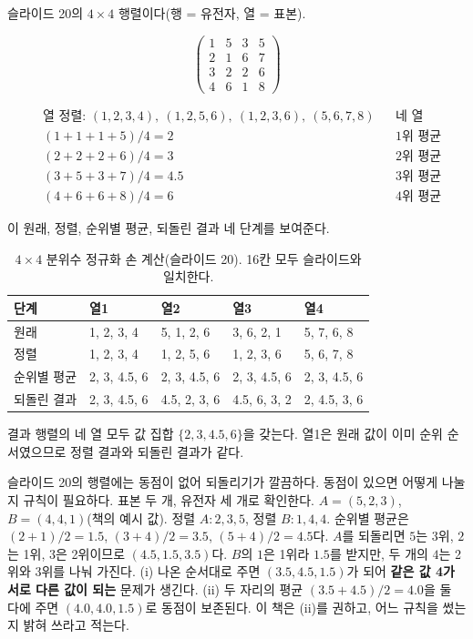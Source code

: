 \begin{example}
\label{ex:qq-quantile-norm}
슬라이드 20의 $4 \times 4$ 행렬이다(행 = 유전자, 열 = 표본).

\[
  \begin{pmatrix} 1 & 5 & 3 & 5 \\ 2 & 1 & 6 & 7 \\ 3 & 2 & 2 & 6 \\ 4 & 6 & 1 & 8 \end{pmatrix}
\]

\begin{align*}
  &\text{열 정렬: } (1,2,3,4),\ (1,2,5,6),\ (1,2,3,6),\ (5,6,7,8) && \text{네 열}\\
  &(1{+}1{+}1{+}5)/4 = 2 && \text{1위 평균}\\
  &(2{+}2{+}2{+}6)/4 = 3 && \text{2위 평균}\\
  &(3{+}5{+}3{+}7)/4 = 4.5 && \text{3위 평균}\\
  &(4{+}6{+}6{+}8)/4 = 6 && \text{4위 평균}
\end{align*}

이 원래, 정렬, 순위별 평균, 되돌린 결과 네
단계를 보여준다.

\begin{table}[H]\centering
\begin{tabularx}{\linewidth}{@{}l X X X X@{}}
\toprule
단계 & 열1 & 열2 & 열3 & 열4 \\
\midrule
원래 & 1, 2, 3, 4 & 5, 1, 2, 6 & 3, 6, 2, 1 & 5, 7, 6, 8 \\
\midrule
정렬 & 1, 2, 3, 4 & 1, 2, 5, 6 & 1, 2, 3, 6 & 5, 6, 7, 8 \\
\midrule
순위별 평균 & 2, 3, 4.5, 6 & 2, 3, 4.5, 6 & 2, 3, 4.5, 6 & 2, 3, 4.5, 6 \\
\midrule
되돌린 결과 & 2, 3, 4.5, 6 & 4.5, 2, 3, 6 & 4.5, 6, 3, 2 & 2, 4.5, 3, 6 \\
\bottomrule
\end{tabularx}
\caption{$4\times4$ 분위수 정규화 손 계산(슬라이드 20). 16칸 모두
슬라이드와 일치한다.}
\label{tab:qq-quantile-norm}
\end{table}

결과 행렬의 네 열 모두 값 집합 $\{2, 3, 4.5, 6\}$을 갖는다. 열1은 원래
값이 이미 순위 순서였으므로 정렬 결과와 되돌린 결과가 같다.
\end{example}

\begin{pitfall}
슬라이드 20의 행렬에는 동점이 없어 되돌리기가 깔끔하다. 동점이 있으면
어떻게 나눌지 규칙이 필요하다. 표본 두 개, 유전자 세 개로 확인한다.
$A = (5, 2, 3)$, $B = (4, 4, 1)$(책의 예시 값). 정렬 $A: 2, 3, 5$,
정렬 $B: 1, 4, 4$. 순위별 평균은 $(2{+}1)/2 = 1.5$, $(3{+}4)/2 = 3.5$,
$(5{+}4)/2 = 4.5$다. $A$를 되돌리면 $5$는 3위, $2$는 1위, $3$은 2위이므로
$(4.5, 1.5, 3.5)$다. $B$의 $1$은 1위라 $1.5$를 받지만, 두 개의 $4$는
2위와 3위를 나눠 가진다. (i) 나온 순서대로 주면 $(3.5, 4.5, 1.5)$가
되어 \textbf{같은 값 4가 서로 다른 값이 되는} 문제가 생긴다. (ii)
두 자리의 평균 $(3.5+4.5)/2 = 4.0$을 둘 다에 주면 $(4.0, 4.0, 1.5)$로
동점이 보존된다. 이 책은 (ii)를 권하고, 어느 규칙을 썼는지 밝혀 쓰라고
적는다.
\end{pitfall}

